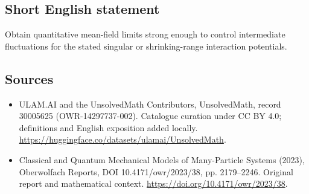 \documentclass[11pt]{article}
\begin{document}
\subsection{Short English statement}
Obtain quantitative mean-field limits strong enough to control intermediate fluctuations for the stated singular or shrinking-range interaction potentials.
\subsection{Sources}
\begin{itemize}
\item[\hypertarget{source:30005625:1}{S1}] ULAM.AI and the UnsolvedMath Contributors, UnsolvedMath, record 30005625 (OWR-14297737-002). Catalogue curation under CC BY 4.0; definitions and English exposition added locally.
\url{https://huggingface.co/datasets/ulamai/UnsolvedMath}.
\item[\hypertarget{source:30005625:2}{S2}] Classical and Quantum Mechanical Models of Many-Particle Systems (2023), Oberwolfach Reports, DOI 10.4171/owr/2023/38, pp. 2179--2246. Original report and mathematical context.
\url{https://doi.org/10.4171/owr/2023/38}.
\end{itemize}
\label{end:30005625}
\end{document}
